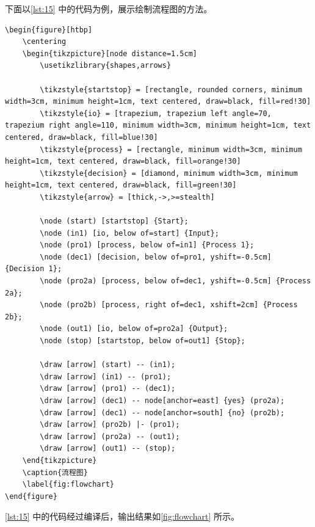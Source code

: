 \documentclass[a4paper]{article}
\begin{document}
下面以\cref{lst:15} 中的代码为例，展示绘制流程图的方法。

\begin{center}
    \label{lst:15}
    \begin{verbatim}
\begin{figure}[htbp]
    \centering
    \begin{tikzpicture}[node distance=1.5cm]
        \usetikzlibrary{shapes,arrows}

        \tikzstyle{startstop} = [rectangle, rounded corners, minimum width=3cm, minimum height=1cm, text centered, draw=black, fill=red!30]
        \tikzstyle{io} = [trapezium, trapezium left angle=70, trapezium right angle=110, minimum width=3cm, minimum height=1cm, text centered, draw=black, fill=blue!30]
        \tikzstyle{process} = [rectangle, minimum width=3cm, minimum height=1cm, text centered, draw=black, fill=orange!30]
        \tikzstyle{decision} = [diamond, minimum width=3cm, minimum height=1cm, text centered, draw=black, fill=green!30]
        \tikzstyle{arrow} = [thick,->,>=stealth]

        \node (start) [startstop] {Start};
        \node (in1) [io, below of=start] {Input};
        \node (pro1) [process, below of=in1] {Process 1};
        \node (dec1) [decision, below of=pro1, yshift=-0.5cm] {Decision 1};
        \node (pro2a) [process, below of=dec1, yshift=-0.5cm] {Process 2a};
        \node (pro2b) [process, right of=dec1, xshift=2cm] {Process 2b};
        \node (out1) [io, below of=pro2a] {Output};
        \node (stop) [startstop, below of=out1] {Stop};
        
        \draw [arrow] (start) -- (in1);
        \draw [arrow] (in1) -- (pro1);
        \draw [arrow] (pro1) -- (dec1);
        \draw [arrow] (dec1) -- node[anchor=east] {yes} (pro2a);
        \draw [arrow] (dec1) -- node[anchor=south] {no} (pro2b);
        \draw [arrow] (pro2b) |- (pro1);
        \draw [arrow] (pro2a) -- (out1);
        \draw [arrow] (out1) -- (stop);
    \end{tikzpicture}
    \caption{流程图}
    \label{fig:flowchart}
\end{figure}
    \end{verbatim}
\end{center}

\cref{lst:15} 中的代码经过编译后，输出结果如\cref{fig:flowchart} 所示。

\vspace{0.75cm}
\end{document}
